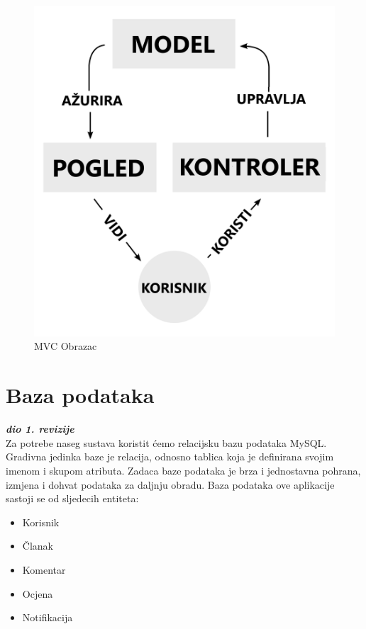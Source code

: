 		\begin{figure}[H]
			\includegraphics[scale=0.2]{slike/MVCObrazac.PNG}
			\centering
			\caption{MVC Obrazac}
			\label{fig:mvc_obrazac}
		\end{figure}

		\eject

				
		\section{Baza podataka}
			
			\textbf{\textit{dio 1. revizije}}\\
			
			Za potrebe naseg sustava koristit ćemo relacijsku bazu podataka MySQL.
			Gradivna jedinka baze je relacija, odnosno tablica koja je definirana svojim imenom i skupom atributa. 
			Zadaca baze podataka je brza i jednostavna pohrana, izmjena i dohvat podataka za daljnju obradu.
			Baza podataka ove aplikacije sastoji se od sljedecih entiteta: 
			\begin{itemize}
				\item Korisnik
				\item Članak
				\item Komentar
				\item Ocjena
				\item Notifikacija
			  \end{itemize}
		
